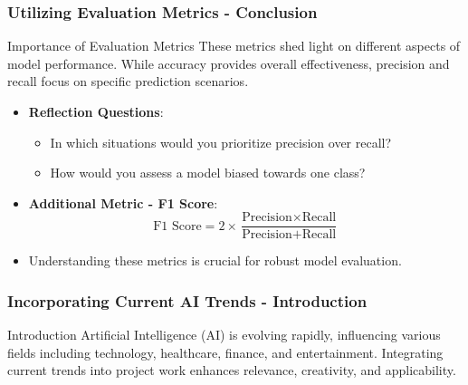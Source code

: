\documentclass[aspectratio=169]{beamer}
\begin{document}
\begin{frame}[fragile]
  \frametitle{Utilizing Evaluation Metrics - Conclusion}
  \begin{block}{Importance of Evaluation Metrics}
    These metrics shed light on different aspects of model performance. While accuracy provides overall effectiveness, precision and recall focus on specific prediction scenarios.
  \end{block}

  \begin{itemize}
    \item \textbf{Reflection Questions}:
      \begin{itemize}
        \item In which situations would you prioritize precision over recall?
        \item How would you assess a model biased towards one class?
      \end{itemize}
    \item \textbf{Additional Metric - F1 Score}:
      \begin{equation} 
        \text{F1 Score} = 2 \times \frac{\text{Precision} \times \text{Recall}}{\text{Precision} + \text{Recall}} 
      \end{equation}
    \item Understanding these metrics is crucial for robust model evaluation.
  \end{itemize}
\end{frame}

\begin{frame}[fragile]
    \frametitle{Incorporating Current AI Trends - Introduction}
    \begin{block}{Introduction}
        Artificial Intelligence (AI) is evolving rapidly, influencing various fields including technology, healthcare, finance, and entertainment. 
        Integrating current trends into project work enhances relevance, creativity, and applicability.
    \end{block}
\end{frame}
\end{document}
